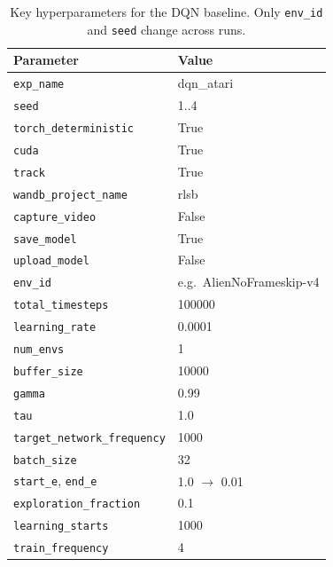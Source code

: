\begin{table}
	\caption{Key hyperparameters for the DQN baseline. Only \texttt{env\_id} and \texttt{seed} change across runs.}
	\label{tab:dqn_hyperparams}
	\centering
	\begin{tabular}{ll}
		\toprule
		\textbf{Parameter} & \textbf{Value} \\
		\midrule
		\texttt{exp\_name}                & dqn\_atari \\
		\texttt{seed}                     & 1..4 \\
		\texttt{torch\_deterministic}     & True \\
		\texttt{cuda}                     & True \\
		\texttt{track}                    & True \\
		\texttt{wandb\_project\_name}     & rlsb \\
		\texttt{capture\_video}           & False \\
		\texttt{save\_model}              & True \\
		\texttt{upload\_model}            & False \\
		\texttt{env\_id}                  & e.g.\ AlienNoFrameskip-v4 \\
		\texttt{total\_timesteps}         & 100000 \\
		\texttt{learning\_rate}           & 0.0001 \\
		\texttt{num\_envs}                & 1 \\
		\texttt{buffer\_size}             & 10000 \\
		\texttt{gamma}                    & 0.99 \\
		\texttt{tau}                      & 1.0 \\
		\texttt{target\_network\_frequency} & 1000 \\
		\texttt{batch\_size}             & 32 \\
		\texttt{start\_e}, \texttt{end\_e} & 1.0 $\to$ 0.01 \\
		\texttt{exploration\_fraction}    & 0.1 \\
		\texttt{learning\_starts}         & 1000 \\
		\texttt{train\_frequency}         & 4 \\
		\bottomrule
	\end{tabular}
\end{table}

